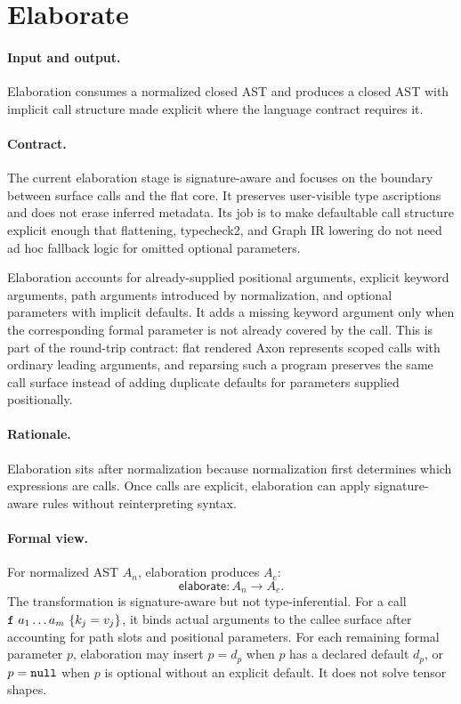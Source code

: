 \section{Elaborate}

\paragraph{Input and output.}
Elaboration consumes a normalized closed AST and produces a closed AST with
implicit call structure made explicit where the language contract requires it.

\paragraph{Contract.}
The current elaboration stage is signature-aware and focuses on the boundary
between surface calls and the flat core.  It preserves user-visible type
ascriptions and does not erase inferred metadata.  Its job is to make
defaultable call structure explicit enough that flattening, typecheck2, and
Graph IR lowering do not need ad hoc fallback logic for omitted optional
parameters.

Elaboration accounts for already-supplied positional arguments, explicit
keyword arguments, path arguments introduced by normalization, and optional
parameters with implicit  defaults.  It adds a missing keyword
argument only when the corresponding formal parameter is not already covered by
the call.  This is part of the round-trip contract: flat rendered Axon
represents scoped calls with ordinary leading  arguments, and
reparsing such a program preserves the same call surface instead of adding
duplicate defaults for parameters supplied positionally.

\paragraph{Rationale.}
Elaboration sits after normalization because normalization first determines
which expressions are calls.  Once calls are explicit, elaboration can apply
signature-aware rules without reinterpreting syntax.

\paragraph{Formal view.}
For normalized AST \(A_n\), elaboration produces \(A_e\):
\[
  \mathsf{elaborate}: A_n \rightarrow A_e .
\]
The transformation is signature-aware but not type-inferential.  For a call
\(\code{f}\ a_1 \ldots a_m\ \{k_j=v_j\}\), it binds actual arguments to the
callee surface after accounting for path slots and positional parameters.  For
each remaining formal parameter \(p\), elaboration may insert \(p=d_p\) when
\(p\) has a declared default \(d_p\), or \(p=\texttt{null}\) when \(p\) is
optional without an explicit default.  It does not solve tensor shapes.

